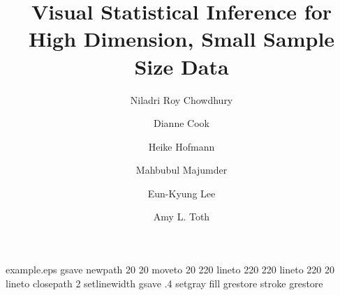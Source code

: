 %
%
%
%
%
\begin{filecontents*}{example.eps}
gsave
newpath
  20 20 moveto
  20 220 lineto
  220 220 lineto
  220 20 lineto
closepath
2 setlinewidth
gsave
  .4 setgray fill
grestore
stroke
grestore
\end{filecontents*}
%
\RequirePackage{fix-cm}
%
\documentclass[smallextended]{svjour3}       %
%
\smartqed  %
%
\usepackage{graphicx}
\usepackage{times}
\usepackage{natbib}
\usepackage{multicol}
\usepackage{hyperref}

\usepackage{amsmath, amssymb, fullpage, array, algorithm2e,graphicx,mathtools, xparse}

\usepackage{color}
\usepackage{subfigure}
\newtheorem{thm}{Theorem}[section]
\newtheorem{dfn}{Definition}[section]
\newtheorem{cor}{Corollary}[thm]
\newtheorem{con}{Conjecture}[thm]

\newcommand{\blue}{\color{blue}}
\newcommand{\red}{\color{red}}

\topmargin -0.10in   %
\textheight 8.5in  %





\title{Visual Statistical Inference for High Dimension, Small Sample Size Data}\label{ch:largepsmalln}
\vspace{-0.8cm}
\author{Niladri Roy Chowdhury \and 
Dianne Cook \and
Heike Hofmann \and
Mahbubul Majumder \and
Eun-Kyung Lee \and
Amy L. Toth}

